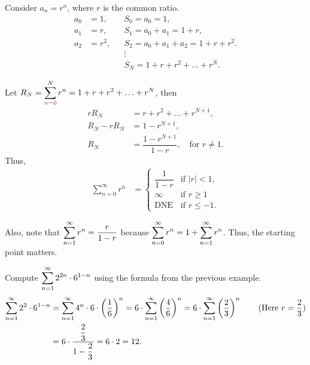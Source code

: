 \begin{ex}
    Consider $a_n = r^n$, where $r$ is the common ratio.
    \begin{align*}
        a_0 &= 1,  &&S_0 = a_0 = 1, \\
        a_1 &= r,  &&S_1 = a_0 + a_1 = 1 + r, \\
        a_2 &= r^2,  &&S_2 = a_0 + a_1 + a_2 = 1 + r + r^2.\\
        & && \vdots\\
        & && S_N = 1 + r + r^2 + \ldots + r^N.
    \end{align*}
    
    Let $R_N = \dsum_{\red{n=0}}^N r^n = 1 + r + r^2 + \ldots + r^N$, then
    \begin{align*}
        r R_N &= r + r^2 + \ldots + r^{N+1}, \\
        R_N - r R_N &= 1 - r^{N+1}, \\
        R_N &= \dfrac{1 - r^{N+1}}{1 - r}, \quad \text{for } r \neq 1.
    \end{align*}
    Thus,
    \begin{align*}
        \sum_{n=0}^\infty r^n &= \begin{cases} 
            \dfrac{1}{1 - r} & \text{if } |r| < 1, \\
            \infty & \text{if } r \geq 1\\
            \text{DNE} & \text{if } r \leq -1.
        \end{cases}
    \end{align*}
    
    Also, note that $\displaystyle\sum_{n=1}^\infty r^n = \dfrac{r}{1-r}$ because $\displaystyle\sum_{n=0}^\infty r^n = 1 + \displaystyle\sum_{n=1}^\infty r^n$. Thus, the starting point matters.
\end{ex}

\begin{ex}
    Compute $\displaystyle\sum_{n=1}^\infty 2^{2n} \cdot 6^{1-n}$ using the formula from the previous example. 
    \begin{align*}
        \sum_{n=1}^\infty 2^{2} \cdot 6^{1-n} &= \sum_{n=1}^\infty 4^n \cdot 6 \cdot \left(\dfrac{1}{6}\right)^n = 6 \cdot \sum_{n=1}^\infty \left(\dfrac{4}{6}\right)^n = 6 \cdot \sum_{n=1}^\infty \left(\dfrac{2}{3}\right)^n \tag{Here $r = \dfrac{2}{3}$}\\
        &= 6 \cdot \dfrac{\dfrac{2}{3}}{1-\dfrac{2}{3}} = 6\cdot 2 = 12.
    \end{align*}
\end{ex}

